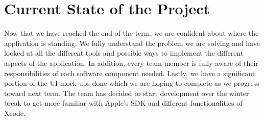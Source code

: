 \documentclass[onecolumn, draftclsnofoot,10pt, compsoc]{IEEEtran}
\begin{document}
\section{Current State of the Project}

Now that we have reached the end of the term, we are confident about where the application is standing. We fully understand the problem we are solving and have looked at all the different tools and possible ways to implement the different aspects of the application. In addition, every team member is fully aware of their responsibilities of each software component needed. Lastly, we have a significant portion of the UI mock-ups done which we are hoping to complete as we progress toward next term. The team has decided to start development over the winter break to get more familiar with Apple's SDK and different functionalities of Xcode.
\end{document}
